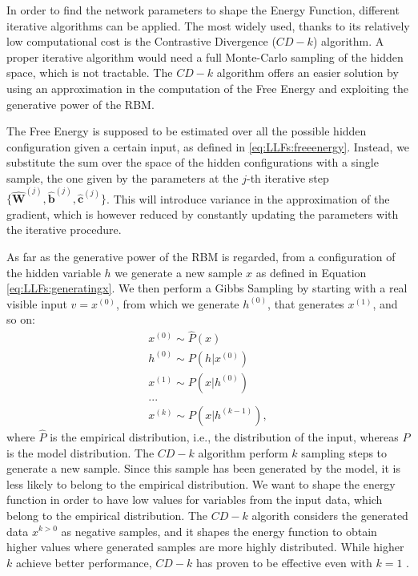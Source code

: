 In order to find the network parameters to shape the Energy Function, different iterative algorithms can be applied. The most widely used, thanks to its relatively low computational cost is the Contrastive Divergence ($CD-k$) algorithm. A proper iterative algorithm would need a full Monte-Carlo sampling of the hidden space, which is not tractable. The $CD-k$ algorithm offers an easier solution by using an approximation in the computation of the Free Energy and exploiting the generative power of the RBM. 

The Free Energy is supposed to be estimated over all the possible hidden configuration given a certain input, as defined in \ref{eq:LLFs:freeenergy}. Instead, we substitute the sum over the space of the hidden configurations with a single sample, the one given by the parameters at the $j$-th iterative step  $\{\hat{\mathbf{W}}^{(j)}, \hat{\mathbf{b}}^{(j)}, \hat{\mathbf{c}}^{(j)} \}$. This will introduce variance in the approximation of the gradient, which is however reduced by constantly updating the parameters with the iterative procedure.

As far as the generative power of the RBM is regarded, from a configuration of the hidden variable $h$ we generate a new sample $x$ as defined in Equation \ref{eq:LLFs:generatingx}. We then perform a Gibbs Sampling by starting with a real visible input $v=x^{(0)}$, from which we generate $h^{(0)}$, that generates $x^{(1)}$, and so on:
\begin{align*}
x^{(0)} \sim \hat{P}(x)\\
h^{(0)} \sim P(h|x^{(0)})\\
x^{(1)} \sim P(x|h^{(0)})\\
...\\
x^{(k)} \sim P(x|h^{(k-1)}),
\end{align*}
where  $\hat{P}$ is the empirical distribution, i.e., the distribution of the input, whereas $P$ is the model distribution.
The $CD-k$ algorithm perform $k$ sampling steps to generate a new sample. Since this sample has been generated by the model, it is less likely to belong to the empirical distribution. We want to shape the energy function in order to have low values for variables from the input data, which belong to the empirical distribution. The $CD-k$ algorith considers the generated data $x^{k>0}$ as negative samples, and it shapes the energy function to obtain higher values where generated samples are more highly distributed. While higher $k$ achieve better performance, $CD-k$ has proven to be effective even with $k=1$ \cite{Bengio2009}.


